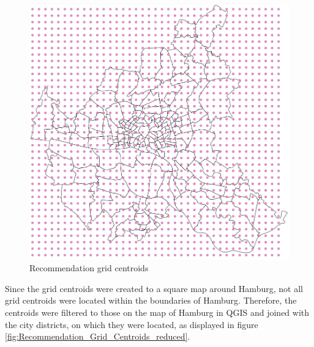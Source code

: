 \documentclass[a4paper, 11pt, oneside]{Thesis}  %
\begin{document}
\begin{figure}[h]
\includegraphics[scale=0.7]{Figures/Recommendation_map/Recommendation_Grid_Centroids.png}
\centering
\caption{Recommendation grid centroids}
\label{fig:Recommendation_Grid_Centroids}
\end{figure}

Since the grid centroids were created to a square map around Hamburg, not all grid centroids were located within the boundaries of Hamburg. Therefore, the centroids were filtered to those on the map of Hamburg in QGIS and joined with the city districts, on which they were located, as displayed in figure \ref{fig:Recommendation_Grid_Centroids_reduced}.
\end{document}
